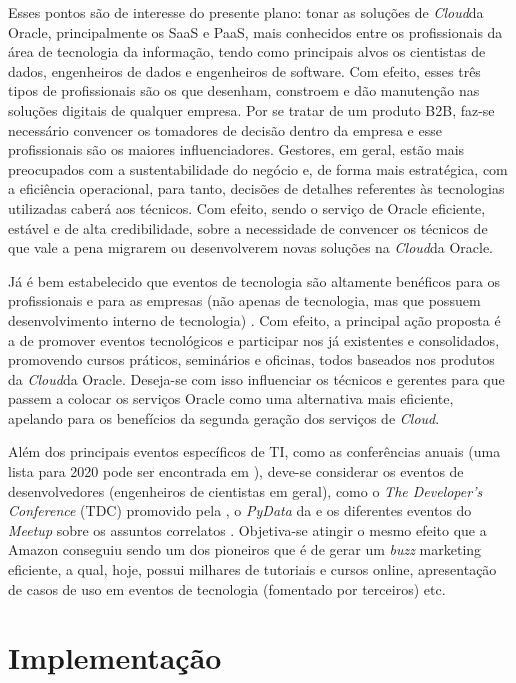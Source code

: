 \documentclass[a4paper]{article}
\newcommand{\C}{\emph{Cloud}}
\begin{document}
Esses pontos são de interesse do presente plano: tonar as soluções de \C da Oracle, principalmente os SaaS e PaaS, mais conhecidos entre os profissionais da área de tecnologia da informação, tendo como principais alvos os cientistas de dados, engenheiros de dados e engenheiros de software. Com efeito, esses três tipos de profissionais são os que desenham, constroem e dão manutenção nas soluções digitais de qualquer empresa. Por se tratar de um produto B2B, faz-se necessário convencer os tomadores de decisão dentro da empresa e esse profissionais são os maiores influenciadores. Gestores, em geral, estão mais preocupados com a sustentabilidade do negócio e, de forma mais estratégica, com a eficiência operacional, para tanto, decisões de detalhes referentes às tecnologias utilizadas caberá aos técnicos. Com efeito, sendo o serviço de Oracle eficiente, estável e de alta credibilidade, sobre a necessidade de convencer os técnicos de que vale a pena migrarem ou desenvolverem novas soluções na \C da Oracle.

Já é bem estabelecido que eventos de tecnologia são altamente benéficos para os profissionais \cite{10Reason10:online} e para as empresas (não apenas de tecnologia, mas que possuem desenvolvimento interno de tecnologia) \cite{5keybene63:online}. Com efeito, a principal ação proposta é a de promover eventos tecnológicos e participar nos já existentes e consolidados, promovendo cursos práticos, seminários e oficinas, todos baseados nos produtos da \C da Oracle. Deseja-se com isso influenciar os técnicos e gerentes para que passem a colocar os serviços Oracle como uma alternativa mais eficiente, apelando para os benefícios da segunda geração dos serviços de \C.

Além dos principais eventos específicos de TI, como as conferências anuais (uma lista para 2020 pode ser encontrada em ), deve-se considerar os eventos de desenvolvedores (engenheiros de cientistas em geral), como o \emph{The Developer's Conference} (TDC) promovido pela , o \emph{PyData} da  e os diferentes eventos do \emph{Meetup} sobre os assuntos correlatos \cite{Meetup:online}. Objetiva-se atingir o mesmo efeito que a Amazon conseguiu sendo um dos pioneiros que é de gerar um \emph{buzz} marketing eficiente, a qual, hoje, possui milhares de tutoriais e cursos online, apresentação de casos de uso em eventos de tecnologia (fomentado por terceiros) etc.


\section{Implementação}
\end{document}
